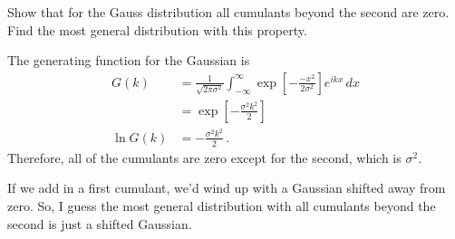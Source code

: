 

Show that for the Gauss distribution all cumulants beyond the second are zero.
Find the most general distribution with this property.


The generating function for the Gaussian is
\begin{align*}
G(k)
&= \frac{1}{\sqrt{2 \pi \sigma^2}} \int_{-\infty}^\infty
\exp \left[ - \frac{-x^2}{2 \sigma^2} \right] e^{i k x} \, dx \\
&= \exp \left[ - \frac{\sigma^2 k^2}{2} \right] \\
\ln G(k)
&= - \frac{\sigma^2 k^2}{2} \, .
\end{align*}
Therefore, all of the cumulants are zero except for the second, which is $\sigma^2$.

If we add in a first cumulant, we'd wind up with a Gaussian shifted away from zero.
So, I guess the most general distribution with all cumulants beyond the second is just a shifted Gaussian.
